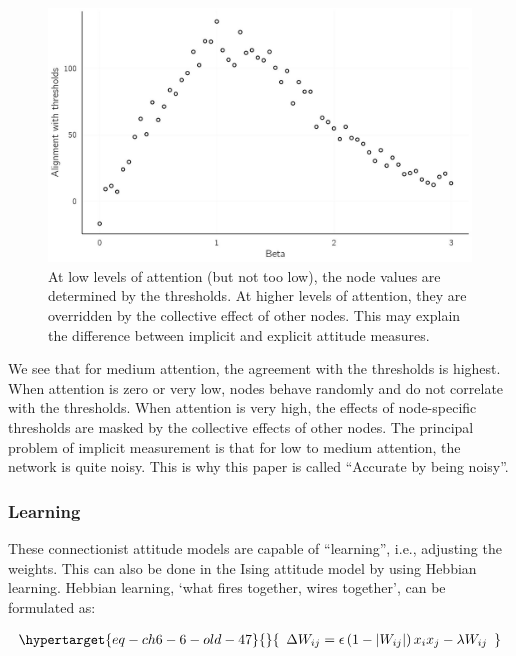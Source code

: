 \documentclass[
  a4paper,
  DIV=11,
  numbers=noendperiod,
  oneside]{scrreprt}
\begin{document}
\begin{figure}

{\centering \includegraphics{media/ch6/fig-ch6-img13-old-82.jpg}

}

\caption{\label{fig-ch6-img13-old-82}At low levels of attention (but not
too low), the node values are determined by the thresholds. At higher
levels of attention, they are overridden by the collective effect of
other nodes. This may explain the difference between implicit and
explicit attitude measures.}

\end{figure}

We see that for medium attention, the agreement with the thresholds is
highest. When attention is zero or very low, nodes behave randomly and
do not correlate with the thresholds. When attention is very high, the
effects of node-specific thresholds are masked by the collective effects
of other nodes. The principal problem of implicit measurement is that
for low to medium attention, the network is quite noisy. This is why
this paper is called ``Accurate by being noisy''.

\hypertarget{sec-Learning}{%
\subsubsection{Learning}\label{sec-Learning}}

These connectionist attitude models are capable of ``learning'', i.e.,
adjusting the weights. This can also be done in the Ising attitude model
by using Hebbian learning. Hebbian learning, `what fires together, wires
together', can be formulated as:

\begin{equation}\protect\hypertarget{eq-ch6-6-old-47}{}{\begin{array}{r}
\mathrm{\Delta}W_{ij} = \epsilon\left( 1 - \left| W_{ij} \right| \right)x_{i}x_{j} - \lambda W_{ij}
\end{array}}\label{eq-ch6-6-old-47}\end{equation}
\end{document}
